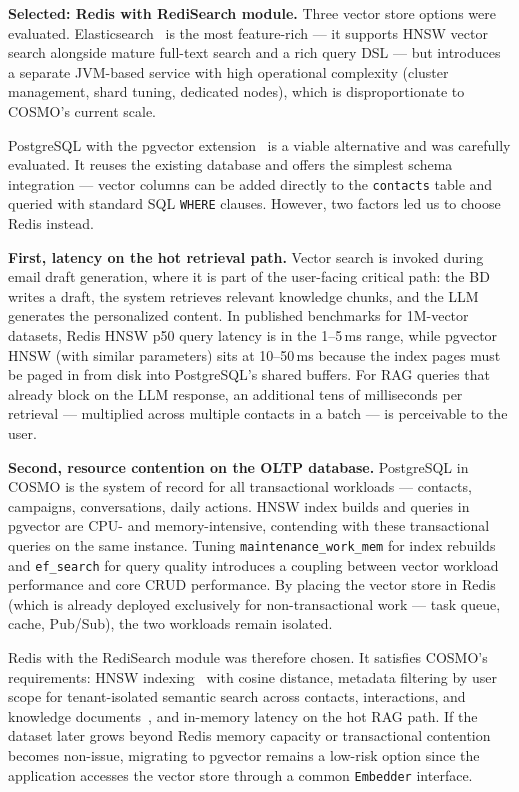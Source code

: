 \documentclass[a4paper]{article}
\begin{document}
\textbf{Selected: Redis with RediSearch module.}
Three vector store options were evaluated.
Elasticsearch~\cite{elasticsearch_knn} is the most feature-rich ---
it supports HNSW vector search alongside mature full-text search
and a rich query DSL --- but introduces a separate JVM-based
service with high operational complexity (cluster management,
shard tuning, dedicated nodes), which is disproportionate to
COSMO's current scale.

PostgreSQL with the pgvector extension~\cite{pgvector} is a viable
alternative and was carefully evaluated. It reuses the existing
database and offers the simplest schema integration --- vector
columns can be added directly to the \texttt{contacts} table and
queried with standard SQL \texttt{WHERE} clauses. However, two
factors led us to choose Redis instead.

\textbf{First, latency on the hot retrieval path.}
Vector search is invoked during email draft generation, where it
is part of the user-facing critical path: the BD writes a draft,
the system retrieves relevant knowledge chunks, and the LLM
generates the personalized content. In published benchmarks for
1M-vector datasets, Redis HNSW p50 query latency is in the
1--5\,ms range, while pgvector HNSW (with similar parameters)
sits at 10--50\,ms because the index pages must be paged in from
disk into PostgreSQL's shared buffers. For RAG queries that
already block on the LLM response, an additional tens of
milliseconds per retrieval --- multiplied across multiple
contacts in a batch --- is perceivable to the user.

\textbf{Second, resource contention on the OLTP database.}
PostgreSQL in COSMO is the system of record for all transactional
workloads --- contacts, campaigns, conversations, daily actions.
HNSW index builds and queries in pgvector are CPU- and
memory-intensive, contending with these transactional queries on
the same instance. Tuning \texttt{maintenance\_work\_mem} for
index rebuilds and \texttt{ef\_search} for query quality
introduces a coupling between vector workload performance and
core CRUD performance. By placing the vector store in Redis
(which is already deployed exclusively for non-transactional
work --- task queue, cache, Pub/Sub), the two workloads remain
isolated.

Redis with the RediSearch module was therefore chosen. It
satisfies COSMO's requirements: HNSW indexing~\cite{malkov2018hnsw}
with cosine distance, metadata filtering by user scope for
tenant-isolated semantic search across contacts, interactions, and
knowledge documents~\cite{redis_vectorsearch}, and in-memory
latency on the hot RAG path. If the dataset later grows beyond
Redis memory capacity or transactional contention becomes
non-issue, migrating to pgvector remains a low-risk option since
the application accesses the vector store through a common
\texttt{Embedder} interface.
\end{document}
